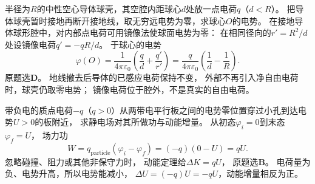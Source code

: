 \problemtext 半径为$R$的中性空心导体球壳，其空腔内距球心$d$处放一点电荷$q$（$d<R$）。
把导体球壳暂时接地再断开接地线，取无穷远电势为零，求球心$O$的电势。
\workings
在接地导体球形腔中，对内部点电荷可用镜像法使球面电势为零：
在相同径向的$r'=R^2/d$处设镜像电荷$q'=-qR/d$。
于球心的电势
\[
\varphi(O)=\frac{1}{4\pi\varepsilon_0}
\left(\frac qd+\frac{q'}{r'}\right)
=\boxed{\frac{q}{4\pi\varepsilon_0}
\left(\frac1d-\frac1R\right)}.
\]
原题选\textbf{D}。
\crosscheck 地线撤去后导体的已感应电荷保持不变，
外部不再引入净自由电荷时，球壳仍取零电势；
镜像电荷位于腔外，不是真实的自由电荷。

\problemtext 带负电的质点电荷$-q$（$q>0$）从两带电平行板之间的电势零位置穿过小孔到达电势$U>0$的板附近，
求静电场对其所做功与动能增量。
\workings
从初态$\varphi_i=0$到末态$\varphi_f=U$，
场力功
\[
W=q_{\mathrm{particle}}(\varphi_i-\varphi_f)
=(-q)(0-U)=\boxed{qU}.
\]
忽略碰撞、阻力或其他非保守力时，
动能定理给$\boxed{\Delta K=qU}$，
原题选\textbf{B}。
\crosscheck 电荷量为负、电势升高，所以电势能减小，
$\Delta U=(-q)U=-qU$，动能增量相反为正。
